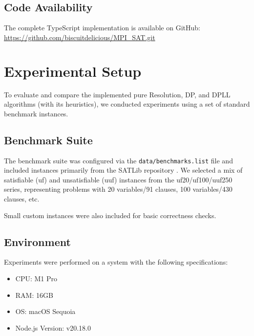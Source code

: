 \documentclass[12pt, a4paper]{article}
\begin{document}
\subsection{Code Availability}
The complete TypeScript implementation is available on GitHub:
\url{https://github.com/biscuitdelicious/MPI_SAT.git} 

\section{Experimental Setup}
\label{sec:experiments}

To evaluate and compare the implemented pure Resolution, DP, and DPLL algorithms (with its heuristics), we conducted experiments using a set of standard benchmark instances.

\subsection{Benchmark Suite}
The benchmark suite was configured via the \texttt{data/benchmarks.list} file and included instances primarily from the SATLib repository \cite{SATLib}. We selected a mix of satisfiable (uf) and unsatisfiable (uuf) instances from the uf20/uf100/uuf250 series, representing problems with 20 variables/91 clauses, 100 variables/430 clauses, etc. 

Small custom instances were also included for basic correctness checks.

\subsection{Environment}
Experiments were performed on a system with the following specifications:
\begin{itemize}
    \item CPU: M1 Pro
    \item RAM: 16GB
    \item OS: macOS Sequoia
    \item Node.js Version: v20.18.0
\end{itemize}
\end{document}
